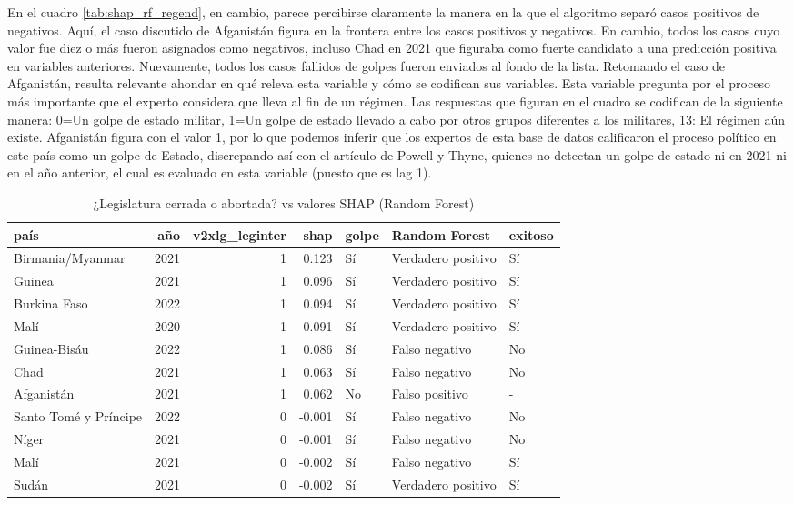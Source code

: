 \documentclass{article}
\begin{document}
En el cuadro \ref{tab:shap_rf_regend}, en cambio, parece percibirse claramente la manera en la que 
el algoritmo separó casos positivos de negativos. Aquí, el caso discutido de Afganistán figura en la
frontera entre los casos positivos y negativos. En cambio, todos los casos cuyo valor fue diez o más
fueron asignados como negativos, incluso Chad en 2021 que figuraba como fuerte candidato a una 
predicción positiva en variables anteriores. Nuevamente, todos los casos fallidos de golpes fueron
enviados al fondo de la lista. Retomando el caso de Afganistán, resulta relevante ahondar en qué releva
esta variable y cómo se codifican sus variables. Esta variable pregunta por el proceso más 
importante que el experto considera que lleva al fin de un régimen\cite{CopMet24}. Las respuestas que 
figuran en el cuadro se codifican de la siguiente manera: 0=Un golpe de estado militar, 1=Un golpe de 
estado llevado a cabo por otros grupos diferentes a los militares, 13: El régimen aún existe. Afganistán
figura con el valor 1, por lo que podemos inferir que los expertos de esta base de datos calificaron
el proceso político en este país como un golpe de Estado, discrepando así con el artículo de Powell y 
Thyne, quienes no detectan un golpe de estado ni en 2021 ni en el año anterior, el cual es evaluado
en esta variable (puesto que es lag 1).

\begin{table}[H]
  \centering
  \begin{tabular}{lrrrlll}
    \toprule
    país & año & v2xlg\_leginter & shap & golpe & Random Forest & exitoso \\
    \midrule
    Birmania/Myanmar & 2021 & 1 & 0.123 & Sí & Verdadero positivo & Sí \\
    Guinea & 2021 & 1 & 0.096 & Sí & Verdadero positivo & Sí \\
    Burkina Faso & 2022 & 1 & 0.094 & Sí & Verdadero positivo & Sí \\
    Malí & 2020 & 1 & 0.091 & Sí & Verdadero positivo & Sí \\
    Guinea-Bisáu & 2022 & 1 & 0.086 & Sí & Falso negativo & No \\
    Chad & 2021 & 1 & 0.063 & Sí & Falso negativo & No \\
    Afganistán & 2021 & 1 & 0.062 & No & Falso positivo & - \\
    Santo Tomé y Príncipe & 2022 & 0 & -0.001 & Sí & Falso negativo & No \\
    Níger & 2021 & 0 & -0.001 & Sí & Falso negativo & No \\
    Malí & 2021 & 0 & -0.002 & Sí & Falso negativo & Sí \\
    Sudán & 2021 & 0 & -0.002 & Sí & Verdadero positivo & Sí \\
    \bottomrule
    \end{tabular}
\caption{¿Legislatura cerrada o abortada? vs valores SHAP (Random Forest) \label{tab:shap_rf_leginter}}
\end{table}
\end{document}
